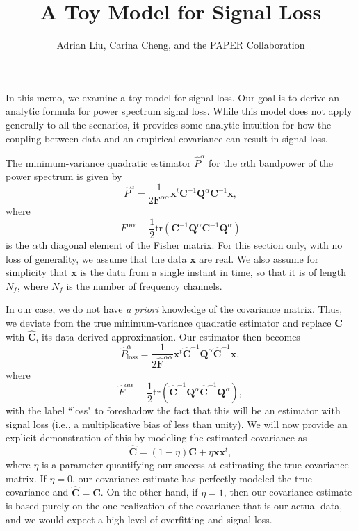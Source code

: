 \documentclass[12pt,preprint]{aastex}
\newcommand{\x}{\mathbf{x}}
\newcommand{\C}{\mathbf{C}}
\newcommand{\Chat}{\mathbf{\widehat{C}}}
\newcommand{\F}{\mathbf{F}}
\newcommand{\Q}{\mathbf{Q}}
\begin{document}
\title{A Toy Model for Signal Loss} 
\author{Adrian Liu, Carina Cheng, and the PAPER Collaboration}
\maketitle
\vspace{1cm}

In this memo, we examine a toy model for signal loss. Our goal is to derive an analytic formula for power spectrum signal loss. While this model does not apply generally to all the scenarios, it provides some analytic intuition for how the coupling between data and an empirical covariance can result in signal loss.

The minimum-variance quadratic estimator $\widehat{P}^\alpha$ for the $\alpha$th bandpower of the power spectrum is given by 
\begin{equation}
\widehat{P}^\alpha = \frac{1} {2 \F^{\alpha \alpha} }\x^t \C^{-1} \Q^{\alpha} \C^{-1} \x,
\end{equation}
where
\begin{equation}
F^{\alpha \alpha} \equiv \frac{1}{2} \textrm{tr} \left( \C^{-1} \Q^\alpha \C^{-1} \Q^\alpha \right)
\end{equation}
is the $\alpha$th diagonal element of the Fisher matrix. For this section only, with no loss of generality, we assume that the data $\textbf{x}$ are real. We also assume for simplicity that $\mathbf{x}$ is the data from a single instant in time, so that it is of length $N_f$, where $N_f$ is the number of frequency channels.

In our case, we do not have \emph{a priori} knowledge of the covariance matrix. Thus, we deviate from the true minimum-variance quadratic estimator and replace $\C$ with $\Chat$, its data-derived approximation. Our estimator then becomes
\begin{equation}
\label{eq:phatloss}
\widehat{P}^\alpha_\textrm{loss} = \frac{1} {2 \widehat{\F}^{\alpha \alpha} }\x^t \Chat^{-1} \Q^{\alpha} \Chat^{-1} \x,
\end{equation}
where
\begin{equation}
\widehat{F}^{\alpha \alpha} \equiv \frac{1}{2} \textrm{tr} \left( \Chat^{-1} \Q^\alpha \Chat^{-1} \Q^\alpha \right),
\end{equation}
with the label ``loss" to foreshadow the fact that this will be an estimator with signal loss (i.e., a multiplicative bias of less than unity). We will now provide an explicit demonstration of this by modeling the estimated covariance as
\begin{equation}
\label{eq:ChatDef}
\Chat = (1-\eta) \C + \eta \x \x^t,
\end{equation}
where $\eta$ is a parameter quantifying our success at estimating the true covariance matrix. If $\eta = 0$, our covariance estimate has perfectly modeled the true covariance and $\Chat = \C$. On the other hand, if $\eta =1$, then our covariance estimate is based purely on the one realization of the covariance that is our actual data, and we would expect a high level of overfitting and signal loss.
\end{document}
